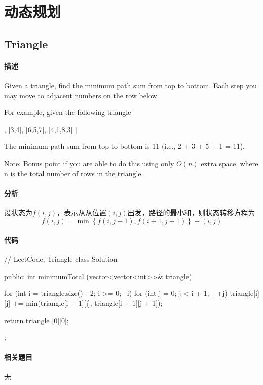 \chapter{动态规划}


\section{Triangle} %
\label{sec:triangle}


\subsubsection{描述}
Given a triangle, find the minimum path sum from top to bottom. Each step you may move to adjacent numbers on the row below.

For example, given the following triangle
\begin{Code}
[
     [2],
    [3,4],
   [6,5,7],
  [4,1,8,3]
]
\end{Code}
The minimum path sum from top to bottom is 11 (i.e., 2 + 3 + 5 + 1 = 11).

Note: Bonus point if you are able to do this using only $O(n)$ extra space, where n is the total number of rows in the triangle.


\subsubsection{分析}
设状态为$f(i, j)$，表示从从位置$(i,j)$出发，路径的最小和，则状态转移方程为
$$
f(i,j)=\min\left\{f(i,j+1),f(i+1,j+1)\right\}+(i,j)
$$


\subsubsection{代码}
\begin{Code}
// LeetCode, Triangle
class Solution {
public:
    int minimumTotal (vector<vector<int>>& triangle) {
        for (int i = triangle.size() - 2; i >= 0; --i)
            for (int j = 0; j < i + 1; ++j)
                triangle[i][j] += min(triangle[i + 1][j],
                        triangle[i + 1][j + 1]);

        return triangle [0][0];
    }
};
\end{Code}


\subsubsection{相关题目}
\begindot
\item 无
\myenddot



